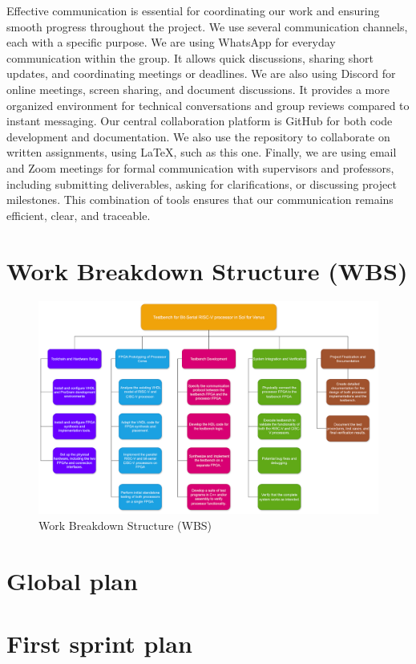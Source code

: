 \documentclass[10pt]{article}
\begin{document}
Effective communication is essential for coordinating our work and ensuring smooth progress throughout the project. We use several communication channels, each with a specific purpose.  
We are using WhatsApp for everyday communication within the group. It allows quick discussions, sharing short updates, and coordinating meetings or deadlines.  
We are also using Discord for online meetings, screen sharing, and document discussions. It provides a more organized environment for technical conversations and group reviews compared to instant messaging.  
Our central collaboration platform is GitHub for both code development and documentation. We also use the repository to collaborate on written assignments, using LaTeX, such as this one.  
Finally, we are using email and Zoom meetings for formal communication with supervisors and professors, including submitting deliverables, asking for clarifications, or discussing project milestones.  
This combination of tools ensures that our communication remains efficient, clear, and traceable.

\FloatBarrier
\section{Work Breakdown Structure (WBS)}
\begin{figure}[h]
\centering
\includegraphics[width=\linewidth]{WBS.png}
\caption{Work Breakdown Structure (WBS)}
\label{fig:timeline}
\end{figure}

\section{Global plan}
\subsection{}
\section{First sprint plan}
\end{document}
